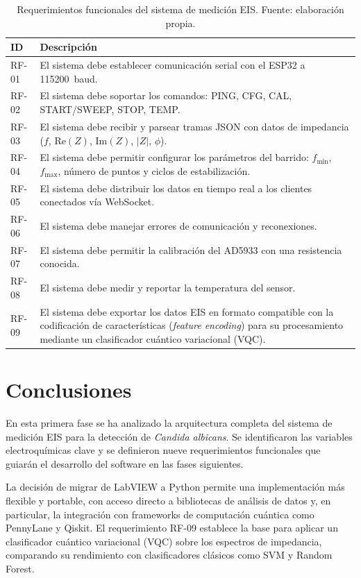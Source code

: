 \documentclass[11pt,a4paper,spanish]{book}
\begin{document}
\begin{table}[h]
	\centering
	\begin{tabular}{l p{10cm}}
		\hline\hline
		ID & Descripci\'{o}n \\ [0.5ex]
		\hline
		RF-01 & El sistema debe establecer comunicaci\'{o}n serial con el ESP32 a 115200~baud. \\
		RF-02 & El sistema debe soportar los comandos: PING, CFG, CAL, START/SWEEP, STOP, TEMP. \\
		RF-03 & El sistema debe recibir y parsear tramas JSON con datos de impedancia ($f$, $\mathrm{Re}(Z)$, $\mathrm{Im}(Z)$, $|Z|$, $\phi$). \\
		RF-04 & El sistema debe permitir configurar los par\'{a}metros del barrido: $f_{\min}$, $f_{\max}$, n\'{u}mero de puntos y ciclos de estabilizaci\'{o}n. \\
		RF-05 & El sistema debe distribuir los datos en tiempo real a los clientes conectados v\'{i}a WebSocket. \\
		RF-06 & El sistema debe manejar errores de comunicaci\'{o}n y reconexiones. \\
		RF-07 & El sistema debe permitir la calibraci\'{o}n del AD5933 con una resistencia conocida. \\
		RF-08 & El sistema debe medir y reportar la temperatura del sensor. \\
		RF-09 & El sistema debe exportar los datos EIS en formato compatible con la codificaci\'{o}n de caracter\'{i}sticas (\textit{feature encoding}) para su procesamiento mediante un clasificador cu\'{a}ntico variacional (VQC). \\
		\hline
	\end{tabular}
	\caption[Requerimientos funcionales]{Requerimientos funcionales del sistema de medici\'{o}n EIS. Fuente: elaboraci\'{o}n propia.}
	\label{tab:reqs}
\end{table}


\chapter{Conclusiones}

En esta primera fase se ha analizado la arquitectura completa del sistema de medici\'{o}n EIS para la detecci\'{o}n de \textit{Candida albicans}. Se identificaron las variables electroqu\'{i}micas clave y se definieron nueve requerimientos funcionales que guiar\'{a}n el desarrollo del software en las fases siguientes.

La decisi\'{o}n de migrar de LabVIEW a Python permite una implementaci\'{o}n m\'{a}s flexible y portable, con acceso directo a bibliotecas de an\'{a}lisis de datos y, en particular, la integraci\'{o}n con frameworks de computaci\'{o}n cu\'{a}ntica como PennyLane y Qiskit. El requerimiento RF-09 establece la base para aplicar un clasificador cu\'{a}ntico variacional (VQC) sobre los espectros de impedancia, comparando su rendimiento con clasificadores cl\'{a}sicos como SVM y Random Forest.
\end{document}

